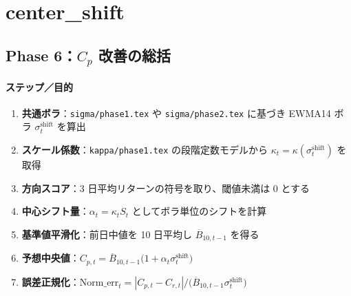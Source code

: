 
\section*{center\_shift}\nopagebreak[4]

\subsection*{Phase 6：$C_p$ 改善の総括}\nopagebreak[4]
\paragraph{ステップ／目的}
\begin{flushleft}
\begin{enumerate}
  \item \textbf{共通ボラ}：{\scriptsize\verb|sigma/phase1.tex|} や {\scriptsize\verb|sigma/phase2.tex|} に基づき
        EWMA14 ボラ \(\sigma_t^{\mathrm{shift}}\) を算出
  \item \textbf{スケール係数}：{\scriptsize\verb|kappa/phase1.tex|} の段階定数モデルから
        \(\kappa_t=\kappa(\sigma_t^{\mathrm{shift}})\) を取得
  \item \textbf{方向スコア}：3 日平均リターンの符号を取り、閾値未満は 0 とする
  \item \textbf{中心シフト量}：\(\alpha_t=\kappa_t S_t\) としてボラ単位のシフトを計算
  \item \textbf{基準値平滑化}：前日中値を 10 日平均し \(\overline{B}_{10,t-1}\) を得る
  \item \textbf{予想中央値}：\(C_{p,t}=\overline{B}_{10,t-1}\bigl(1+\alpha_t\sigma_t^{\mathrm{shift}}\bigr)\)
  \item \textbf{誤差正規化}：\(\mathrm{Norm\_err}_t=|C_{p,t}-C_{r,t}|\big/\bigl(\overline{B}_{10,t-1}\sigma_t^{\mathrm{shift}}\bigr)\)
\end{enumerate}
\end{flushleft}

